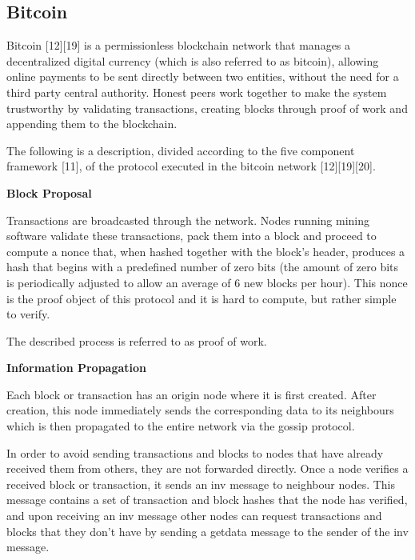 \subsection{Bitcoin}

Bitcoin [12][19] is a permissionless blockchain network that manages a decentralized digital currency (which is also referred to as bitcoin), allowing online payments to be sent directly between two entities, without the need for a third party central authority. Honest peers work together to make the system trustworthy by validating transactions, creating blocks through proof of work and appending them to the blockchain.

The following is a description, divided according to the five component framework [11], of the protocol executed in the bitcoin network [12][19][20].


\vspace{0.5cm}

\textbf{Block Proposal}

Transactions are broadcasted through the network. Nodes running mining software validate these transactions, pack them into a block and proceed to compute a nonce that, when hashed together with the block’s header, produces a hash that begins with a predefined number of zero bits (the amount of zero bits is periodically adjusted to allow an average of 6 new blocks per hour). This nonce is the proof object of this protocol and it is hard to compute, but rather simple to verify.

The described process is referred to as proof of work.

\vspace{0.25cm}


\textbf{Information Propagation}

Each block or transaction has an origin node where it is first created. After creation, this node immediately sends the corresponding data to its neighbours which is then propagated to the entire network via the gossip protocol.

In order to avoid sending transactions and blocks to nodes that have already received them from others, they are not forwarded directly. Once  a node verifies a received block or transaction, it sends an inv message to neighbour nodes. This message contains a set of transaction and block hashes that the node has verified, and upon receiving an inv message other nodes can request transactions and blocks that they don’t have by sending a getdata message to the sender of the inv message.

